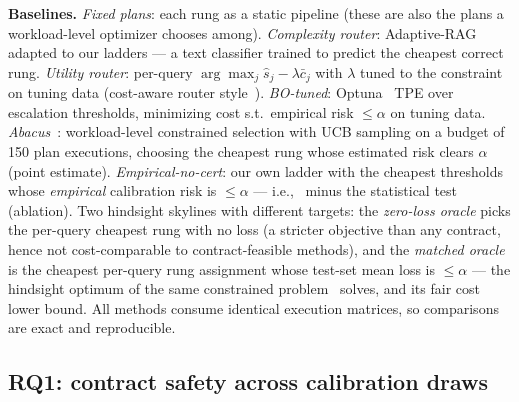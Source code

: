 \textbf{Baselines.} \emph{Fixed plans}: each rung as a static pipeline
(these are also the plans a workload-level optimizer chooses among).
\emph{Complexity router}: Adaptive-RAG~\cite{jeong2024adaptiverag} adapted
to our ladders --- a text classifier trained to predict the cheapest
correct rung. \emph{Utility router}: per-query
$\arg\max_j \hat{s}_j - \lambda \bar c_j$ with $\lambda$ tuned to the
constraint on tuning data (cost-aware router
style~\cite{ding2024hybridllm,hu2024routerbench}).
\emph{BO-tuned}: Optuna~\cite{akiba2019optuna} TPE over escalation
thresholds, minimizing cost s.t.\ empirical risk $\le \alpha$ on tuning
data. \emph{Abacus}~\cite{russo2025abacus}: workload-level constrained
selection with UCB sampling on a budget of 150 plan executions, choosing
the cheapest rung whose estimated risk clears $\alpha$ (point estimate).
\emph{Empirical-no-cert}: our own
ladder with the cheapest thresholds whose \emph{empirical} calibration risk
is $\le\alpha$ --- i.e., \system\ minus the statistical test (ablation).
Two hindsight skylines with different targets: the \emph{zero-loss
oracle} picks the per-query cheapest rung with no loss (a stricter
objective than any contract, hence not cost-comparable to
contract-feasible methods), and the \emph{matched oracle} is the
cheapest per-query rung assignment whose test-set mean loss is
$\le \alpha$ --- the hindsight optimum of the same constrained problem
\system\ solves, and its fair cost lower bound.
All methods consume identical execution matrices, so comparisons are
exact and reproducible.

\subsection{RQ1: contract safety across calibration draws}
\label{sec:exp-safety}


